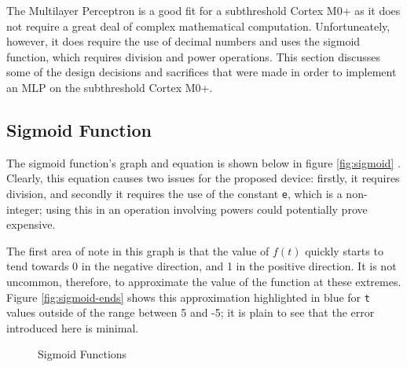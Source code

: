 
The Multilayer Perceptron is a good fit for a subthreshold Cortex M0+ as it does not require a great deal of complex mathematical computation. Unfortuneately, however, it does require the use of decimal numbers and uses the sigmoid function, which requires division and power operations. This section discusses some of the design decisions and sacrifices that were made in order to implement an MLP on the subthreshold Cortex M0+.

\subsection{Sigmoid Function}
The sigmoid function's graph and equation is shown below in figure \ref{fig:sigmoid} . Clearly, this equation causes two issues for the proposed device: firstly, it requires division, and secondly it requires the use of the constant \verb|e|, which is a non-integer; using this in an operation involving powers could potentially prove expensive.

The first area of note in this graph is that the value of $f(t)$ quickly starts to tend towards 0 in the negative direction, and 1 in the positive direction. It is not uncommon, therefore, to approximate the value of the function at these extremes. Figure \ref{fig:sigmoid-ends} shows this approximation highlighted in blue for \verb|t| values outside of the range between 5 and -5; it is plain to see that the error introduced here is minimal.

\begin{figure}[!h]
    \centering
    \caption{Sigmoid Functions \label{fig:sigmoid-options}}
\end{figure}


